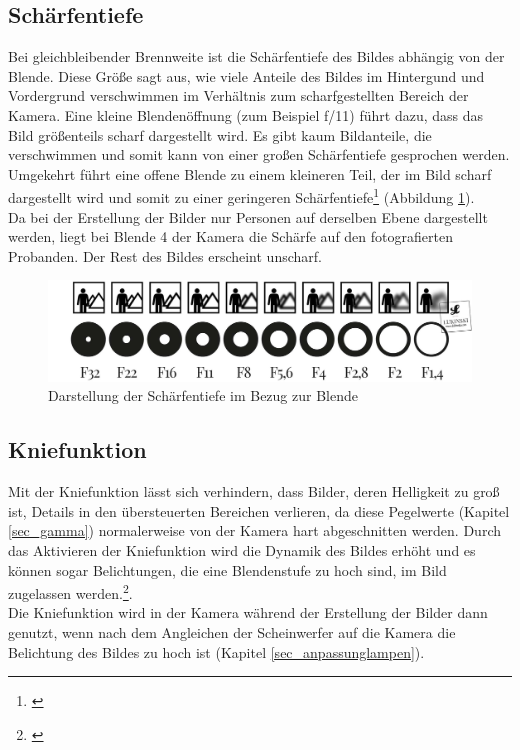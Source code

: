 \subsection{Schärfentiefe}
\label{sec_scharf}
Bei gleichbleibender Brennweite ist die Schärfentiefe des Bildes abhängig von der Blende. Diese Größe sagt aus, wie viele Anteile des Bildes im Hintergund und Vordergrund verschwimmen im Verhältnis zum scharfgestellten Bereich der Kamera. Eine kleine Blendenöffnung (zum Beispiel f/11) führt dazu, dass das Bild größenteils scharf dargestellt wird. Es gibt kaum Bildanteile, die verschwimmen und somit kann von einer großen Schärfentiefe gesprochen werden. Umgekehrt führt eine offene Blende zu einem kleineren Teil, der im Bild scharf dargestellt wird und somit zu einer geringeren Schärfentiefe\footnote{\cite[389]{schmidt}} (Abbildung \ref{b_scharfentiefe}).\\
Da bei der Erstellung der Bilder nur Personen auf derselben Ebene dargestellt werden, liegt bei Blende 4 der Kamera die Schärfe auf den fotografierten Probanden. Der Rest des Bildes erscheint unscharf.

\newpage
\begin{figure}[htp]     %
\centering
\includegraphics[width=1.0\textwidth]{bilder/scharfentiefe} 
\caption {Darstellung der Schärfentiefe im Bezug zur Blende\protect\footnotemark}\label{b_scharfentiefe}
\end{figure}

\subsection{Kniefunktion}
\label{sec_knee}
Mit der Kniefunktion lässt sich verhindern, dass Bilder, deren Helligkeit zu groß ist, Details in den übersteuerten Bereichen verlieren, da diese Pegelwerte (Kapitel \ref{sec_gamma}) normalerweise von der Kamera hart abgeschnitten werden. Durch das Aktivieren der Kniefunktion wird die Dynamik des Bildes erhöht und es können sogar Belichtungen, die eine Blendenstufe zu hoch sind, im Bild zugelassen werden.\footnote{\cite[389]{schmidt}}.\\
Die Kniefunktion wird in der Kamera während der Erstellung der Bilder dann genutzt, wenn nach dem Angleichen der Scheinwerfer auf die Kamera die Belichtung des Bildes zu hoch ist (Kapitel \ref{sec_anpassunglampen}).

